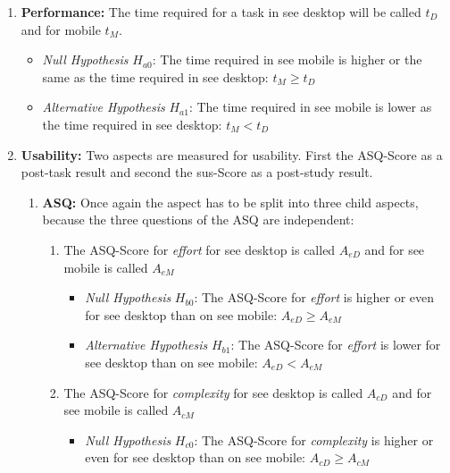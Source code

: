 \begin{enumerate}[{label=\alph*)}]
  \item \textbf{Performance:} The time required for a task in \gls{see} desktop will be called $t_D$ and for mobile $t_M$.
        \begin{itemize}
          \item \textit{Null Hypothesis} $H_{a0}$: The time required in \gls{see} mobile is higher or the same as the time required in \gls{see} desktop: $t_M \geq t_D$
          \item \textit{Alternative Hypothesis} $H_{a1}$: The time required in {\gls{see}} mobile is lower as the time required in \gls{see} desktop: $t_M < t_D$
        \end{itemize}
  \item \textbf{Usability:} Two aspects are measured for \gls{usability}. First the \gls{ASQ}-Score as a \gls{post-task} result and second the \gls{sus}-Score as a \gls{post-study} result.
        \begin{enumerate}[label=\roman*)]
          \item \textbf{ASQ:} Once again the aspect has to be split into three child aspects, because the three questions of the \gls{ASQ} are independent:
                \begin{enumerate}[{label=\arabic*)}]
                  \item The \gls{ASQ}-Score for \textit{effort} for \gls{see} desktop is called $A_{eD}$ and for \gls{see} mobile is called $A_{eM}$
                        \begin{itemize}
                          \item \textit{Null Hypothesis} $H_{b0}$: The \gls{ASQ}-Score for \textit{effort} is higher or even for \gls{see} desktop than on \gls{see} mobile: $A_{eD} \geq A_{eM}$
                          \item \textit{Alternative Hypothesis} $H_{b1}$: The \gls{ASQ}-Score for \textit{effort} is lower for \gls{see} desktop than on \gls{see} mobile: $A_{eD} < A_{eM}$
                        \end{itemize}
                  \item The \gls{ASQ}-Score for \textit{complexity} for \gls{see} desktop is called $A_{cD}$ and for \gls{see} mobile is called $A_{cM}$
                        \begin{itemize}
                          \item \textit{Null Hypothesis} $H_{c0}$: The \gls{ASQ}-Score for \textit{complexity} is higher or even for \gls{see} desktop than on \gls{see} mobile: $A_{cD} \geq A_{cM}$

\end{itemize}
\end{enumerate}
\end{enumerate}
\end{enumerate}
